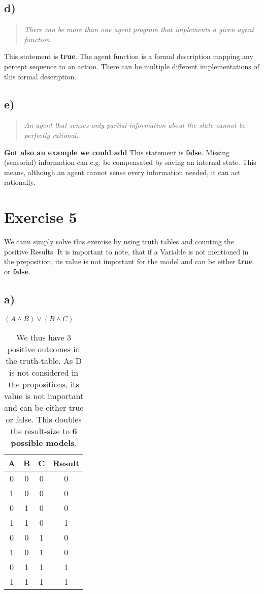 \documentclass[11pt]{article}
\begin{document}
\subsection*{d)}
\begin{quotation}\noindent
\textit{There can be more than one agent program that implements a given agent function.}
\end{quotation}
\noindent
This statement is \textbf{true}. The agent function is a formal description mapping any percept sequence to an action. There can be multiple different implementations of this formal description.

\subsection*{e)}
\begin{quotation}\noindent
\textit{An agent that senses only partial information about the state cannot be perfectly rational.}
\end{quotation}
\noindent
\textbf{Got also an example we could add}
This statement is \textbf{false}. Missing (sensorial) information can e.g. be compensated by saving an internal state. This means, although an agent cannot sense every information needed, it can act rationally.

\newpage

\section*{Exercise 5}
We cann simply solve this exercise by using truth tables and counting the positive Results. It is important to note, that if a Variable is not mentioned in the preposition, its value is not important for the model and can be either \textbf{true} or \textbf{false}.

\subsection*{a)} 
$(A \wedge B) \vee (B \wedge C)$
\begin{table}[h]
  \begin{tabular}{c|c|c||c}
    A & B & C & Result\\
    \hline
    0 & 0 & 0 & 0 \\
    1 & 0 & 0 & 0 \\
    0 & 1 & 0 & 0 \\
    1 & 1 & 0 & 1 \\
    0 & 0 & 1 & 0 \\
    1 & 0 & 1 & 0 \\
    0 & 1 & 1 & 1 \\
    1 & 1 & 1 & 1
  \end{tabular}
  \caption*{We thus have 3 positive outcomes in the truth-table. As D is not considered in the propositions, its value is not important and can be either true or false. This doubles the result-size to \textbf{6 possible models}.}
\end{table}
\end{document}
